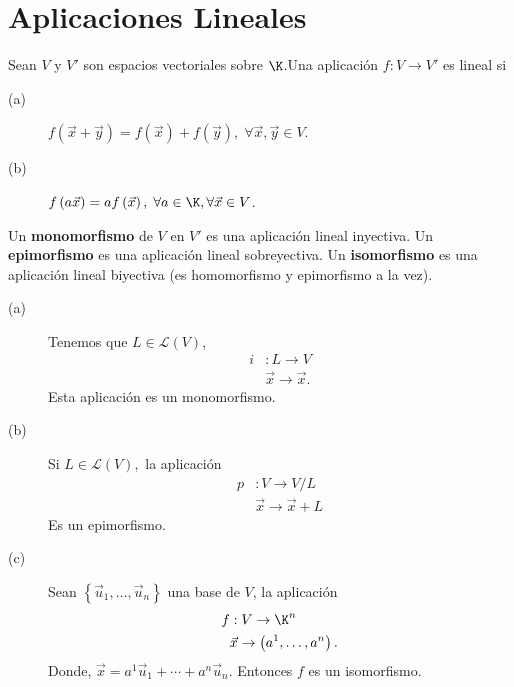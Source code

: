 \chapter{Aplicaciones Lineales}

\begin{fdefinition}
\normalfont Sean $\displaystyle V $ y $\displaystyle V' $ son espacios vectoriales sobre $\displaystyle \K $.Una aplicación $\displaystyle f: V \to V' $ es lineal si
\begin{description}
\item[(a)] $\displaystyle f\left(\vec{x} + \vec{y}\right) = f\left(\vec{x}\right) + f\left(\vec{y}\right), \; \forall \vec{x}, \vec{y} \in V$.
\item[(b)] $\displaystyle f\left(a\vec{x}\right) = a f\left(\vec{x}\right), \; \forall a \in \K, \forall \vec{x} \in V $.
\end{description}
\end{fdefinition}

\begin{fdefinition}[]
\normalfont Un \textbf{monomorfismo} de $\displaystyle V $ en $\displaystyle V' $ es una aplicación lineal inyectiva. Un \textbf{epimorfismo} es una aplicación lineal sobreyectiva. Un \textbf{isomorfismo} es una aplicación lineal biyectiva (es homomorfismo y epimorfismo a la vez).
\end{fdefinition}

\begin{eg}
\normalfont 
\begin{description}
\item[(a)]Tenemos que $\displaystyle L \in \mathcal{L}\left(V\right) $, 
\[
\begin{split}
	i & : L \to V \\
	  & \vec{x} \to \vec{x}.
\end{split}
\]
Esta aplicación es un monomorfismo.
\item[(b)] Si $\displaystyle L \in \mathcal{L}\left(V\right),  $ la aplicación 
	\[
	\begin{split}
		p & : V \to V/L \\
		  & \vec{x} \to \vec{x} + L
	\end{split}
	\]
Es un epimorfismo.
\item[(c)] Sean $\displaystyle \left\{ \vec{u}_{1}, \ldots, \vec{u}_{n}\right\}  $ una base de $\displaystyle V $, la aplicación
	\[
	\begin{split}
		f & : V \to \K^{n} \\
		  & \vec{x} \to \left(a^{1}, \ldots, a^{n}\right).
	\end{split}
	\]
Donde, $\displaystyle \vec{x} = a^{1}\vec{u}_{1} + \cdots + a^{n}\vec{u}_{n} $. Entonces $\displaystyle f $ es un isomorfismo. 
\end{description}
\end{eg}

